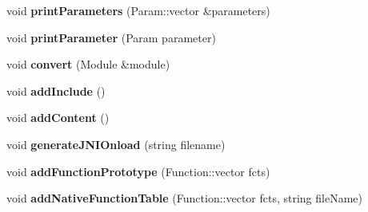 \begin{DoxyCompactItemize}
\item 
\hypertarget{classnsJNI_1_1OutputCpp_acf80e9d105c051713e70614c6b4b898c}{void {\bfseries print\-Parameters} (\-Param\-::vector \&parameters)}\label{classnsJNI_1_1OutputCpp_acf80e9d105c051713e70614c6b4b898c}

\item 
\hypertarget{classnsJNI_1_1OutputCpp_a04977599cf9feb6b5ff2f21bd439d6ac}{void {\bfseries print\-Parameter} (\-Param parameter)}\label{classnsJNI_1_1OutputCpp_a04977599cf9feb6b5ff2f21bd439d6ac}

\item 
\hypertarget{classnsJNI_1_1OutputCpp_a21a91a2ef8ddab6f8059d7c7c880ea9b}{void {\bfseries convert} (\-Module \&module)}\label{classnsJNI_1_1OutputCpp_a21a91a2ef8ddab6f8059d7c7c880ea9b}

\item 
\hypertarget{classnsJNI_1_1OutputCpp_a05534f02fe2223222794c9cf091003aa}{void {\bfseries add\-Include} ()}\label{classnsJNI_1_1OutputCpp_a05534f02fe2223222794c9cf091003aa}

\item 
\hypertarget{classnsJNI_1_1OutputCpp_af4efb3796b9b0cf196728d0f9f40236e}{void {\bfseries add\-Content} ()}\label{classnsJNI_1_1OutputCpp_af4efb3796b9b0cf196728d0f9f40236e}

\item 
\hypertarget{classnsJNI_1_1OutputCpp_a63e21ab10e776ac5b024973d1224a2ef}{void {\bfseries generate\-J\-N\-I\-Onload} (string filename)}\label{classnsJNI_1_1OutputCpp_a63e21ab10e776ac5b024973d1224a2ef}

\item 
\hypertarget{classnsJNI_1_1OutputCpp_a88ce6b3ccb3c7709a2d066a83cdf0746}{void {\bfseries add\-Function\-Prototype} (\-Function\-::vector fcts)}\label{classnsJNI_1_1OutputCpp_a88ce6b3ccb3c7709a2d066a83cdf0746}

\item 
\hypertarget{classnsJNI_1_1OutputCpp_ab15c2696c1383fac20a457a3274d1a3a}{void {\bfseries add\-Native\-Function\-Table} (\-Function\-::vector fcts, string file\-Name)}\label{classnsJNI_1_1OutputCpp_ab15c2696c1383fac20a457a3274d1a3a}

\end{DoxyCompactItemize}
